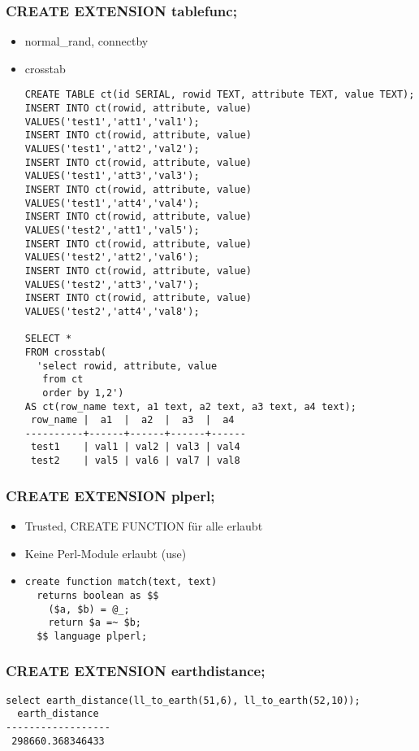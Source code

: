 \documentclass[utf8,hyperref={pdftex,colorlinks,linkcolor=black,citecolor=black,urlcolor=black,filecolor=black,plainpages=false},xcolor=table,hyperref]{beamer}
\begin{document}
\begin{frame}[containsverbatim]
	\frametitle{CREATE EXTENSION tablefunc;}
	\begin{itemize}
		\item normal_rand, connectby
		\item crosstab
			{\scriptsize
			\begin{verbatim}
CREATE TABLE ct(id SERIAL, rowid TEXT, attribute TEXT, value TEXT);
INSERT INTO ct(rowid, attribute, value) VALUES('test1','att1','val1');
INSERT INTO ct(rowid, attribute, value) VALUES('test1','att2','val2');
INSERT INTO ct(rowid, attribute, value) VALUES('test1','att3','val3');
INSERT INTO ct(rowid, attribute, value) VALUES('test1','att4','val4');
INSERT INTO ct(rowid, attribute, value) VALUES('test2','att1','val5');
INSERT INTO ct(rowid, attribute, value) VALUES('test2','att2','val6');
INSERT INTO ct(rowid, attribute, value) VALUES('test2','att3','val7');
INSERT INTO ct(rowid, attribute, value) VALUES('test2','att4','val8');

SELECT *
FROM crosstab(
  'select rowid, attribute, value
   from ct
   order by 1,2')
AS ct(row_name text, a1 text, a2 text, a3 text, a4 text);
 row_name |  a1  |  a2  |  a3  |  a4  
----------+------+------+------+------
 test1    | val1 | val2 | val3 | val4
 test2    | val5 | val6 | val7 | val8
 \end{verbatim}}
	\end{itemize}
\end{frame}

\begin{frame}[containsverbatim]
	\frametitle{CREATE EXTENSION plperl;}
	\begin{itemize}
		\item Trusted, CREATE FUNCTION für alle erlaubt
		\item Keine Perl-Module erlaubt (use)
		\item \begin{verbatim}
create function match(text, text)
  returns boolean as $$
    ($a, $b) = @_;
    return $a =~ $b;
  $$ language plperl;
\end{verbatim}
\end{itemize}
\end{frame}

\begin{frame}[containsverbatim]
	\frametitle{CREATE EXTENSION earthdistance;}
	\begin{verbatim}
select earth_distance(ll_to_earth(51,6), ll_to_earth(52,10));
  earth_distance  
------------------
 298660.368346433
 \end{verbatim}
\end{frame}
\end{document}
